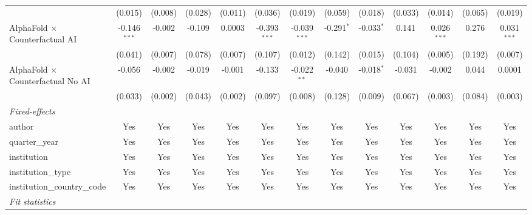 \begin{tabular}{lcccccccccccc}
                                            & (0.015)        & (0.008)     & (0.028) & (0.011) & (0.036)        & (0.019)        & (0.059)      & (0.018)      & (0.033) & (0.014)       & (0.065) & (0.019)\\   
   AlphaFold $\times$ Counterfactual AI     & -0.146$^{***}$ & -0.002      & -0.109  & 0.0003  & -0.393$^{***}$ & -0.039$^{***}$ & -0.291$^{*}$ & -0.033$^{*}$ & 0.141   & 0.026$^{***}$ & 0.276   & 0.031$^{***}$\\   
                                            & (0.041)        & (0.007)     & (0.078) & (0.007) & (0.107)        & (0.012)        & (0.142)      & (0.015)      & (0.104) & (0.005)       & (0.192) & (0.007)\\   
   AlphaFold $\times$ Counterfactual No AI  & -0.056         & -0.002      & -0.019  & -0.001  & -0.133         & -0.022$^{**}$  & -0.040       & -0.018$^{*}$ & -0.031  & -0.002        & 0.044   & 0.0001\\   
                                            & (0.033)        & (0.002)     & (0.043) & (0.002) & (0.097)        & (0.008)        & (0.128)      & (0.009)      & (0.067) & (0.003)       & (0.084) & (0.003)\\   
   \midrule
   \emph{Fixed-effects}\\
   author                                   & Yes            & Yes         & Yes     & Yes     & Yes            & Yes            & Yes          & Yes          & Yes     & Yes           & Yes     & Yes\\  
   quarter\_year                            & Yes            & Yes         & Yes     & Yes     & Yes            & Yes            & Yes          & Yes          & Yes     & Yes           & Yes     & Yes\\  
   institution                              & Yes            & Yes         & Yes     & Yes     & Yes            & Yes            & Yes          & Yes          & Yes     & Yes           & Yes     & Yes\\  
   institution\_type                        & Yes            & Yes         & Yes     & Yes     & Yes            & Yes            & Yes          & Yes          & Yes     & Yes           & Yes     & Yes\\  
   institution\_country\_code               & Yes            & Yes         & Yes     & Yes     & Yes            & Yes            & Yes          & Yes          & Yes     & Yes           & Yes     & Yes\\  
   \midrule
   \emph{Fit statistics}\\

\end{tabular}
